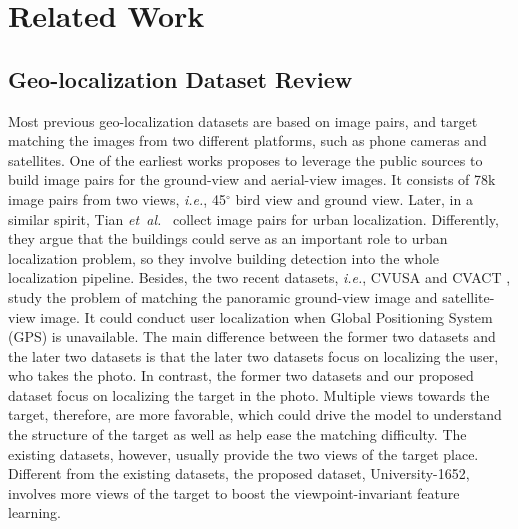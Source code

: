 \documentclass[sigconf]{acmart}
\def\ie{\emph{i.e.}}
\def\etal{\emph{et~al.}}
\begin{document}
\section{Related Work}


\subsection{Geo-localization Dataset Review}
Most previous geo-localization datasets are based on image pairs, and target matching the images from two different platforms, such as phone cameras and satellites. One of the earliest works \cite{lin2015learning} proposes to leverage the public sources to build image pairs for the ground-view and aerial-view images. It consists of 78k image pairs from two views, \ie, 45$^{\circ}$ bird view and ground view. Later, in a similar spirit, Tian \etal~ \cite{tian2017cross} collect image pairs for urban localization. Differently, they argue that the buildings could serve as an important role to urban localization problem, so they involve building detection into the whole localization pipeline. Besides, the two recent datasets, \ie, CVUSA \cite{zhai2017predicting} and CVACT \cite{liu2019lending}, study the problem of matching the panoramic ground-view image and satellite-view image. It could conduct user localization when Global Positioning System (GPS) is unavailable. The main difference between the former two datasets \cite{lin2015learning, tian2017cross} and the later two datasets \cite{zhai2017predicting,liu2019lending} is that the later two datasets focus on localizing the user, who takes the photo. In contrast, the former two datasets and our proposed dataset focus on localizing the target in the photo. Multiple views towards the target, therefore, are more favorable, which could drive the model to understand the structure of the target as well as help ease the matching difficulty. The existing datasets, however, usually provide the two views of the target place. Different from the existing datasets, the proposed dataset, University-1652, involves more views of the target to boost the viewpoint-invariant feature learning. 
\end{document}
